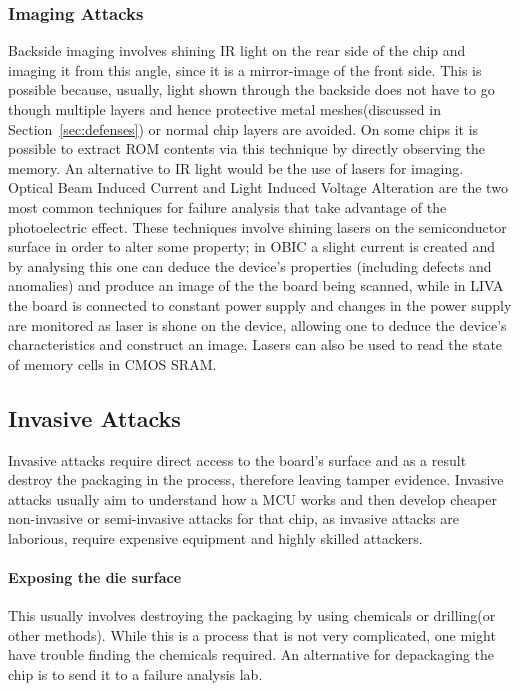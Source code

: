 	\subsubsection{Imaging Attacks}
	Backside imaging involves shining IR light on the rear side of the chip and imaging it from this angle, since it is a mirror-image of the front side. This is possible because, usually, light shown through the backside does not have to go though multiple layers and hence protective metal meshes(discussed in Section~\ref{sec:defenses}) or normal chip layers are avoided. On some chips it is possible to extract ROM contents via this technique by directly observing the memory. An alternative to IR light would be the use of lasers for imaging. Optical Beam Induced Current and Light Induced Voltage Alteration are the two most common techniques for failure analysis that take advantage of the photoelectric effect. These techniques involve shining lasers on the semiconductor surface in order to alter some property; in OBIC a slight current is created and by analysing this one can deduce the device's properties (including defects and anomalies) and produce an image of the the board being scanned, while in LIVA the board is connected to constant power supply and changes in the power supply are monitored as laser is shone on the device, allowing one to deduce the device's characteristics and construct an image\citep{cole:OBIC}. Lasers can also be used to read the state of memory cells in CMOS SRAM\citep{sergei:thesis}.
	
	\subsection{Invasive Attacks}
	Invasive attacks require direct access to the board's surface and as a result destroy the packaging in the process, therefore leaving tamper evidence\citep{sergei:thesis}\citep{hwre}. Invasive attacks usually aim to understand how a MCU works and then develop cheaper non-invasive or semi-invasive attacks for that chip, as invasive attacks are laborious, require expensive equipment and highly skilled attackers\citep{sergei:thesis}.
	
	\paragraph{Exposing the die surface} This usually involves destroying the packaging by using chemicals or drilling(or other methods). While this is a process that is not very complicated\citep{sergei:thesis}, one might have trouble finding the chemicals required. An alternative for depackaging the chip is to send it to a failure analysis lab\citep{website:hacking_the_pic}.
	
